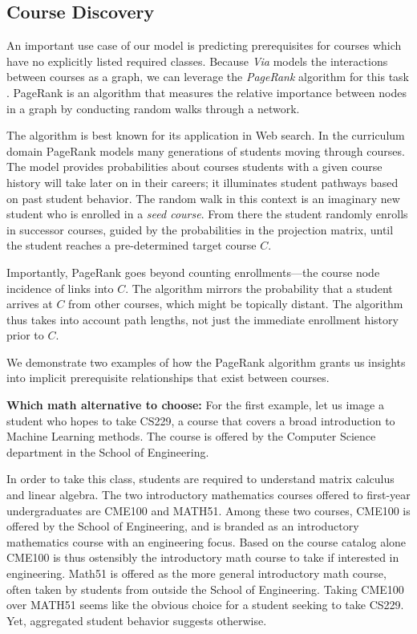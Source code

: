 \subsection{Course Discovery}
An important use case of our model is predicting prerequisites for
courses which have no explicitly listed required classes. Because {\em
  Via} models the interactions between courses as a graph, we can
leverage the {\em PageRank} algorithm for this task
\cite{Page1999}. PageRank is an algorithm that measures the relative
importance between nodes in a graph by conducting random walks through
a network.

The algorithm is best known for its application in Web search. In the
curriculum domain PageRank models many generations of students moving
through courses. The model provides probabilities about courses
students with a given course history will take later on in their
careers; it illuminates student pathways based on past student
behavior. The random walk in this context is an imaginary new student
who is enrolled in a {\em seed course}. From there the student
randomly enrolls in successor courses, guided by the probabilities in
the projection matrix, until the student reaches a pre-determined
target course $C$.

Importantly, PageRank goes beyond counting enrollments---the course
node incidence of links into $C$. The algorithm mirrors the
probability that a student arrives at $C$ from other courses, which
might be topically distant. The algorithm thus takes into account path
lengths, not just the immediate enrollment history prior to $C$.

We demonstrate two examples of how the PageRank algorithm grants us
insights into implicit prerequisite relationships that exist between
courses.

{\bf Which math alternative to choose:} For the first example, let us
image a student who hopes to take CS229, a course that covers a broad
introduction to Machine Learning methods.  The course is offered by
the Computer Science department in the School of Engineering.

In order to take this class, students are required to understand
matrix calculus and linear algebra. The two introductory mathematics
courses offered to first-year undergraduates are CME100 and
MATH51. Among these two courses, CME100 is offered by the School of
Engineering, and is branded as an introductory mathematics course with
an engineering focus. Based on the course catalog alone CME100 is thus
ostensibly the introductory math course to take if interested in
engineering. Math51 is offered as the more general introductory math
course, often taken by students from outside the School of
Engineering. Taking CME100 over MATH51 seems like the obvious choice
for a student seeking to take CS229. Yet, aggregated student behavior
suggests otherwise.

